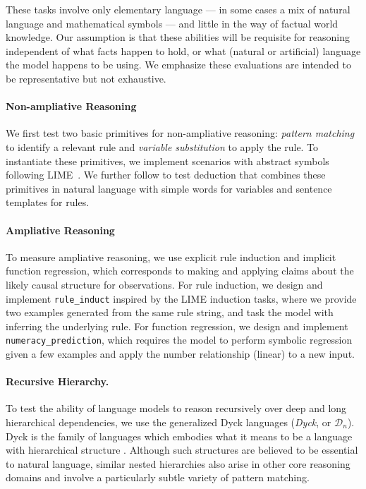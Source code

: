 These tasks involve only elementary language --- in some cases a mix of natural language and mathematical symbols --- and little in the way of factual world knowledge. 
Our assumption is that these abilities will be requisite for reasoning independent of what facts happen to hold, or what (natural or artificial) language the model happens to be using. 
We emphasize these evaluations are intended to be representative but not exhaustive.

\paragraph{Non-ampliative Reasoning} 
We first test two basic primitives for non-ampliative reasoning: 
\textit{pattern matching} to identify a relevant rule
and \textit{variable substitution} to apply the rule. 
To instantiate these primitives, we implement scenarios with abstract symbols following LIME~\citep{wu2021lime}. 
We further follow \citet{Clark2020TransformersAS} to test deduction that combines these primitives in natural language with simple words for variables and sentence templates for rules.

\paragraph{Ampliative Reasoning}
To measure ampliative reasoning, we use explicit rule induction and implicit function regression, which corresponds to making and applying claims about the likely causal structure for observations.
For rule induction, we design and implement \texttt{rule\_induct} inspired by the LIME induction tasks, where we provide two examples generated from the same rule string, and task the model with inferring the underlying rule.
For function regression, we design and implement \texttt{numeracy\_prediction}, which requires the model to perform symbolic regression given a few examples and apply the number relationship (\eg linear) to a new input.

\paragraph{Recursive Hierarchy.} 
To test the ability of language models to reason recursively over deep and long hierarchical dependencies, we use the generalized Dyck languages (\emph{Dyck}, or $\mathcal{D}_n$).
Dyck is the family of languages which embodies what it means to be a language with hierarchical structure \citep{suzgun2019memory}.
Although such structures are believed to be essential to natural language, similar nested hierarchies also arise in other core reasoning domains \citep{Dehaene} and involve a particularly subtle variety of pattern matching.

